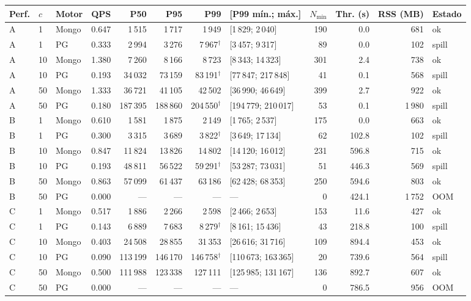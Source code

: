 \begin{tabular}{@{}llllrrrlrrrl@{}}
\toprule
Perf. & $c$ & Motor & QPS & P50 & P95 & P99 & [P99 mín.; máx.] & $N_{\min}$ & Thr. (s) & RSS (MB) & Estado \\
\midrule
A & 1 & Mongo & 0.647 & 1\,515 & 1\,717 & 1\,949 & [1\,829; 2\,040] & 190 & 0.0 & 681 & ok \\
A & 1 & PG & 0.333 & 2\,994 & 3\,276 & 7\,967$^{\dagger}$ & [3\,457; 9\,317] & 89 & 0.0 & 102 & spill \\
A & 10 & Mongo & 1.380 & 7\,260 & 8\,166 & 8\,723 & [8\,343; 14\,323] & 301 & 2.4 & 738 & ok \\
A & 10 & PG & 0.193 & 34\,032 & 73\,159 & 83\,191$^{\dagger}$ & [77\,847; 217\,848] & 41 & 0.1 & 568 & spill \\
A & 50 & Mongo & 1.333 & 36\,721 & 41\,105 & 42\,502 & [36\,990; 46\,649] & 399 & 2.7 & 922 & ok \\
A & 50 & PG & 0.180 & 187\,395 & 188\,860 & 204\,550$^{\dagger}$ & [194\,779; 210\,017] & 53 & 0.1 & 1\,980 & spill \\
\addlinespace[2pt]
B & 1 & Mongo & 0.610 & 1\,581 & 1\,875 & 2\,149 & [1\,765; 2\,537] & 175 & 0.0 & 663 & ok \\
B & 1 & PG & 0.300 & 3\,315 & 3\,689 & 3\,822$^{\dagger}$ & [3\,649; 17\,134] & 62 & 102.8 & 102 & spill \\
B & 10 & Mongo & 0.847 & 11\,824 & 13\,826 & 14\,802 & [14\,120; 16\,012] & 231 & 596.8 & 715 & ok \\
B & 10 & PG & 0.193 & 48\,811 & 56\,522 & 59\,291$^{\dagger}$ & [53\,287; 73\,031] & 51 & 446.3 & 569 & spill \\
B & 50 & Mongo & 0.863 & 57\,099 & 61\,437 & 63\,186 & [62\,428; 68\,353] & 250 & 594.6 & 803 & ok \\
B & 50 & PG & 0.000 & --- & --- & --- & --- & 0 & 424.1 & 1\,752 & OOM \\
\addlinespace[2pt]
C & 1 & Mongo & 0.517 & 1\,886 & 2\,266 & 2\,598 & [2\,466; 2\,653] & 153 & 11.6 & 427 & ok \\
C & 1 & PG & 0.143 & 6\,889 & 7\,683 & 8\,279$^{\dagger}$ & [8\,161; 15\,436] & 43 & 218.8 & 100 & spill \\
C & 10 & Mongo & 0.403 & 24\,508 & 28\,855 & 31\,353 & [26\,616; 31\,716] & 109 & 894.4 & 453 & ok \\
C & 10 & PG & 0.090 & 113\,199 & 146\,170 & 146\,758$^{\dagger}$ & [110\,673; 163\,365] & 20 & 739.6 & 564 & spill \\
C & 50 & Mongo & 0.500 & 111\,988 & 123\,338 & 127\,111 & [125\,985; 131\,167] & 136 & 892.7 & 607 & ok \\
C & 50 & PG & 0.000 & --- & --- & --- & --- & 0 & 786.5 & 956 & OOM \\
\bottomrule
\end{tabular}

